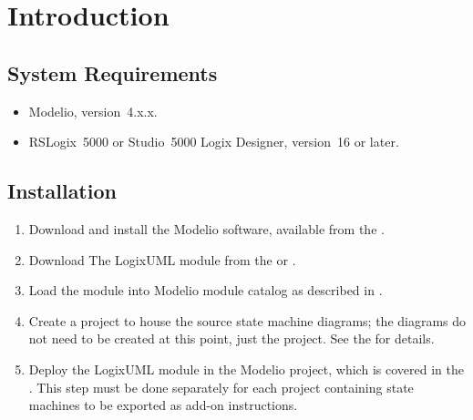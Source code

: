 \section{Introduction}


\subsection{System Requirements}

\begin{itemize}
  \item Modelio, version~4.x.x.

  \item RSLogix~5000 or Studio~5000 Logix Designer, version~16 or later.
\end{itemize}


\subsection{Installation}

\begin{enumerate}
  \item Download and install the Modelio software, available from the
    \textcite{MODELIO}.

  \item Download The LogixUML module from the \textcite{MODELIOSTORE} or
    \textcite{REPO}.

  \item Load the module into Modelio module catalog as described in
    \textcite[Macros catalog]{MODELIOMANUAL}.

  \item Create a project to house the source state machine diagrams;
    the diagrams do not need to be created at this point, just the project.
    See the \textcite[Creating a project]{MODELIOMANUAL} for details.

  \item Deploy the LogixUML module in the Modelio project, which is covered
    in the \textcite[Configuring project modules]{MODELIOMANUAL}.
    This step must be done separately for each project containing state
    machines to be exported as add-on instructions.
\end{enumerate}
